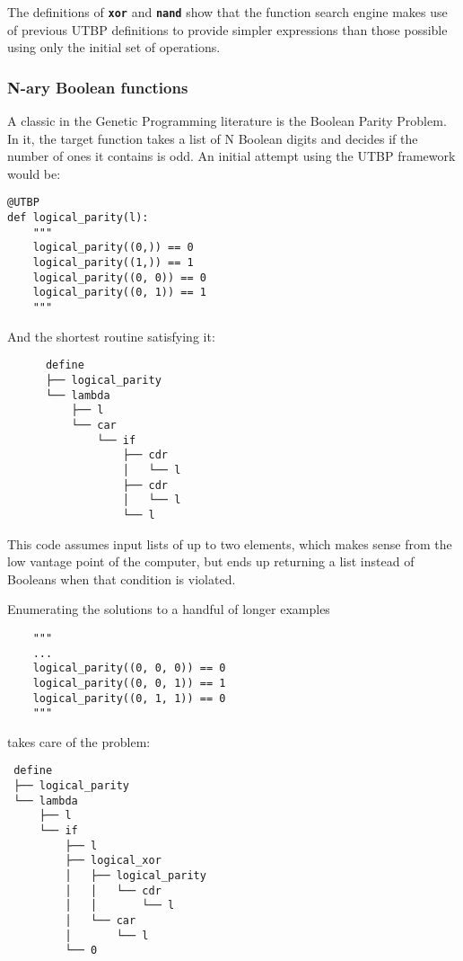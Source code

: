 \documentclass[12pt,twocolumn]{article}
\begin{document}
The definitions of \texttt{\textbf{xor}} and \texttt{\textbf{nand}} show that the function search engine makes use of previous UTBP definitions to provide simpler expressions than those possible using only the initial set of operations.

\subsubsection{N-ary Boolean functions}
A classic in the Genetic Programming literature is the Boolean Parity Problem. In it, the target function takes a list of N Boolean digits and decides if the number of ones it contains is odd. An initial attempt using the UTBP framework would be:

\begin{verbatim}
@UTBP
def logical_parity(l):
    """
    logical_parity((0,)) == 0
    logical_parity((1,)) == 1
    logical_parity((0, 0)) == 0
    logical_parity((0, 1)) == 1
    """
\end{verbatim}

And the shortest routine satisfying it:

\begin{verbatim}
      define
      ├── logical_parity
      └── lambda
          ├── l
          └── car
              └── if
                  ├── cdr
                  │   └── l
                  ├── cdr
                  │   └── l
                  └── l
\end{verbatim}

This code assumes input lists of up to two elements, which makes sense from the low vantage point of the computer, but ends up returning a list instead of Booleans when that condition is violated. 

Enumerating the solutions to a handful of longer examples

\begin{verbatim}
    """
    ...
    logical_parity((0, 0, 0)) == 0
    logical_parity((0, 0, 1)) == 1
    logical_parity((0, 1, 1)) == 0
    """
\end{verbatim}

takes care of the problem:
\begin{verbatim}
 define
 ├── logical_parity
 └── lambda
     ├── l
     └── if
         ├── l
         ├── logical_xor
         │   ├── logical_parity
         │   │   └── cdr
         │   │       └── l
         │   └── car
         │       └── l
         └── 0
\end{verbatim}
\end{document}
